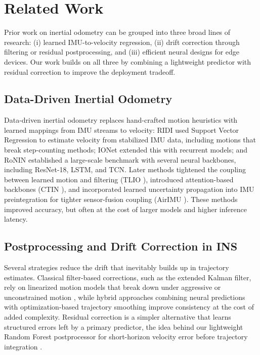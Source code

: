 \documentclass[10pt,conference,letterpaper]{IEEEtran}
\begin{document}
\section{Related Work}
\label{sec:rw}
Prior work on inertial odometry can be grouped into three broad lines of research: (i) learned IMU-to-velocity regression, (ii) drift correction through filtering or residual postprocessing, and (iii) efficient neural designs for edge devices. Our work builds on all three by combining a lightweight predictor with residual correction to improve the deployment tradeoff.

\subsection{Data-Driven Inertial Odometry}

Data-driven inertial odometry replaces hand-crafted motion heuristics
with learned mappings from IMU streams to velocity: RIDI
\cite{ridi2018} used Support Vector Regression to estimate velocity
from stabilized IMU data, including motions that break step-counting
methods; IONet \cite{ionet2018} extended this with recurrent models;
and RoNIN \cite{ronin2019} established a large-scale benchmark with
several neural backbones, including ResNet-18, LSTM, and TCN. Later
methods tightened the coupling between learned motion and filtering
(TLIO \cite{tlio2020}), introduced attention-based backbones (CTIN
\cite{ctin2022}), and incorporated learned uncertainty propagation
into IMU preintegration for tighter sensor-fusion coupling (AirIMU
\cite{airimu2023}). These methods improved accuracy, but often at the
cost of larger models and higher inference latency.

\subsection{Postprocessing and Drift Correction in INS}
Several strategies reduce the drift that inevitably builds up in
trajectory estimates. Classical filter-based corrections, such as the
extended Kalman filter, rely on linearized motion models that break
down under aggressive or unconstrained motion \cite{kalman1960}, while
hybrid approaches combining neural predictions with optimization-based
trajectory smoothing improve consistency \cite{ronin2019} at the cost
of added complexity. Residual correction is a simpler alternative
that learns structured errors left by a primary predictor, the idea
behind our lightweight Random Forest postprocessor for short-horizon
velocity error before trajectory integration
\cite{solin2018,breiman2001,rf_imu_2023}.
\end{document}
